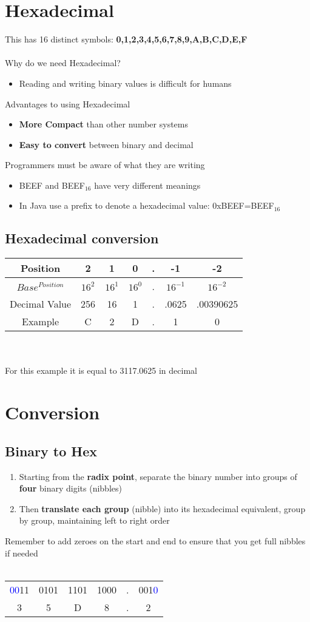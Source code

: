 \documentclass{article}[18pt]
\begin{document}
\section{Hexadecimal}
This has 16 distinct symbols: \textbf{0,1,2,3,4,5,6,7,8,9,A,B,C,D,E,F}\\
\\
Why do we need Hexadecimal?
\begin{itemize}
\item Reading and writing binary values is difficult for humans
\end{itemize}
Advantages to using Hexadecimal
\begin{itemize}
\item \textbf{More Compact} than other number systems
\item \textbf{Easy to convert} between binary and decimal
\end{itemize}
Programmers must be aware of what they are writing
\begin{itemize}
\item BEEF and BEEF$_{16}$ have very different meanings
\item In Java use a prefix to denote a hexadecimal value: 0xBEEF=BEEF$_{16}$
\end{itemize}
\subsection{Hexadecimal conversion}
\begin{tabular}{|c|c|c|c|c|c|c|}
\hline
Position&2&1&0&.&-1&-2\\
\hline
$Base^{Position}$&$16^2$&$16^1$&$16^0$&.&$16^{-1}$&$16^{-2}$\\
\hline
Decimal Value&256&16&1&.&.0625&.00390625\\
\hline
Example&C&2&D&.&1&0\\
\hline
\end{tabular}\\
\\
For this example it is equal to 3117.0625 in decimal
\section{Conversion}
\subsection{Binary to Hex}
\begin{enumerate}
\item Starting from the \textbf{radix point}, separate the binary number into groups of \textbf{four} binary digits (nibbles)
\item Then \textbf{translate each group} (nibble) into its hexadecimal equivalent, group by group, maintaining left to right order
\end{enumerate}
Remember to add zeroes on the start and end to ensure that you get full nibbles if needed\\
\\
\begin{tabular}{c c c c c c}
\textcolor{blue}{00}11&0101&1101&1000&.&001\textcolor{blue}{0}\\
3&5&D&8&.&2
\end{tabular}
\end{document}
